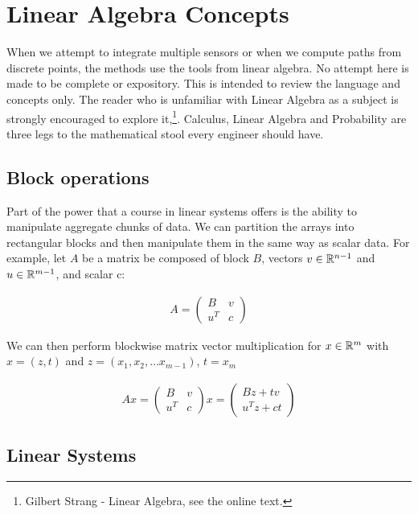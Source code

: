 \hypertarget{linear-algebra-concepts}{%
\section{Linear Algebra Concepts}\label{linear-algebra-concepts}}

When we attempt to integrate multiple sensors or when we compute paths
from discrete points, the methods use the tools from linear algebra. No
attempt here is made to be complete or expository. This is intended to
review the language and concepts only. The reader who is unfamiliar with
Linear Algebra as a subject is strongly encouraged to explore
it,\footnote{Gilbert Strang - Linear Algebra, see the online text.}.
Calculus, Linear Algebra and Probability are three legs to the
mathematical stool every engineer should have.

\hypertarget{block-operations}{%
\subsection{Block operations}\label{block-operations}}

Part of the power that a course in linear systems offers is the ability
to manipulate aggregate chunks of data. We can partition the arrays into
rectangular blocks and then manipulate them in the same way as scalar
data. For example, let \(A\) be a matrix be composed of block \(B\),
vectors \(v\in{\Bbb R}^{n-1}\) and \(u\in{\Bbb R}^{m-1}\), and scalar c:

\[\begin{aligned}
A = \begin{pmatrix} B & v \\ u^T & c \end{pmatrix}
\end{aligned}\]

We can then perform blockwise matrix vector multiplication for
\(x \in {\Bbb R}^m\) with \(x = (z,t)\) and
\(z = (x_1, x_2, \dots x_{m-1})\), \(t = x_m\)

\[\begin{aligned}
Ax = \begin{pmatrix} B & v \\ u^T & c \end{pmatrix} x = \begin{pmatrix} Bz + tv \\ u^T z + ct \end{pmatrix}
\end{aligned}\]

\hypertarget{linear-systems}{%
\subsection{Linear Systems}\label{linear-systems}}


